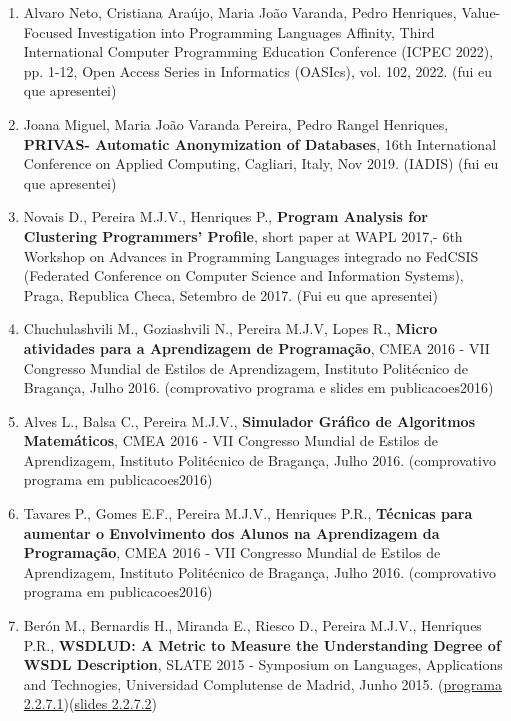 \documentclass[11pt]{article}
\begin{document}
\begin{enumerate}

\item {Alvaro Neto, Cristiana Araújo, Maria João Varanda, Pedro Henriques, Value-Focused Investigation into Programming Languages Affinity, Third International Computer Programming Education Conference (ICPEC 2022), pp. 1-12, Open Access Series in Informatics (OASIcs), vol. 102, 2022. (fui eu que apresentei)}

\item {Joana Miguel, Maria João Varanda Pereira, Pedro Rangel Henriques, {\bf{ PRIVAS- Automatic Anonymization of Databases}}, 16th International Conference on Applied Computing, Cagliari, Italy, Nov 2019. (IADIS) (fui eu que apresentei)}

\item {Novais D., Pereira M.J.V., Henriques P., {\bf{ Program Analysis for Clustering Programmers' Profile}}, short paper at WAPL 2017,- 6th Workshop on Advances in Programming Languages integrado no FedCSIS (Federated Conference on Computer Science and Information Systems), Praga, Republica Checa, Setembro de 2017. (Fui eu que apresentei)}

\item {Chuchulashvili M., Goziashvili N., Pereira M.J.V, Lopes R., {\bf{ Micro atividades para a Aprendizagem de Programação}}, CMEA 2016 - VII Congresso Mundial de Estilos de Aprendizagem, Instituto Politécnico de Bragança, Julho 2016. (comprovativo programa e slides em publicacoes2016)}

\item {Alves L., Balsa C., Pereira M.J.V., {\bf{ Simulador Gráfico de Algoritmos Matemáticos}}, CMEA 2016 - VII Congresso Mundial de Estilos de Aprendizagem, Instituto Politécnico de Bragança, Julho 2016. (comprovativo programa em publicacoes2016)}

\item {Tavares P., Gomes E.F., Pereira M.J.V., Henriques P.R., {\bf{ Técnicas para aumentar o Envolvimento dos Alunos na Aprendizagem da Programação}}, CMEA 2016 - VII Congresso Mundial de Estilos de Aprendizagem, Instituto Politécnico de Bragança, Julho 2016. (comprovativo programa em publicacoes2016)}

\item {Berón M., Bernardis H., Miranda E., Riesco D., Pereira M.J.V., Henriques P.R., {\bf{ WSDLUD: A Metric to Measure the Understanding Degree of WSDL Description}}, SLATE 2015 - Symposium on Languages, Applications and Technogies, Universidad Complutense de Madrid, Junho 2015. (\href{run:ComunicacoesOrais/programas/SLATE2015prog.pdf}{programa 2.2.7.1})(\href{run:ComunicacoesOrais/Slate2015apres.pdf}{slides 2.2.7.2})}


\end{enumerate}
\end{document}
